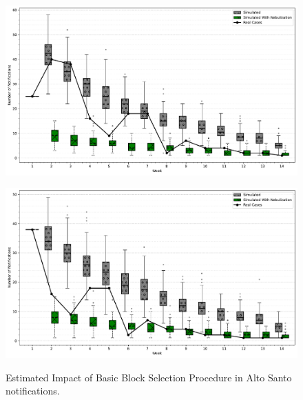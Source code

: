\begin{figure}[h!]
    \begin{minipage}[c]{.45\textwidth}
      \centering
      \includegraphics[scale=0.25]{images/action-experiments/as_2017-01-15_weekly_nebulized.pdf} \\
    \end{minipage}
    \hfill
    \begin{minipage}[c]{.45\textwidth}
        \centering
        \includegraphics[scale=0.25]{images/action-experiments/as_2017-01-29_weekly_nebulized.pdf} \\
    \end{minipage}
    \caption{\label{fig:emergency-action-impact-as} Estimated Impact of Basic Block Selection Procedure in Alto Santo notifications.}
\end{figure}

